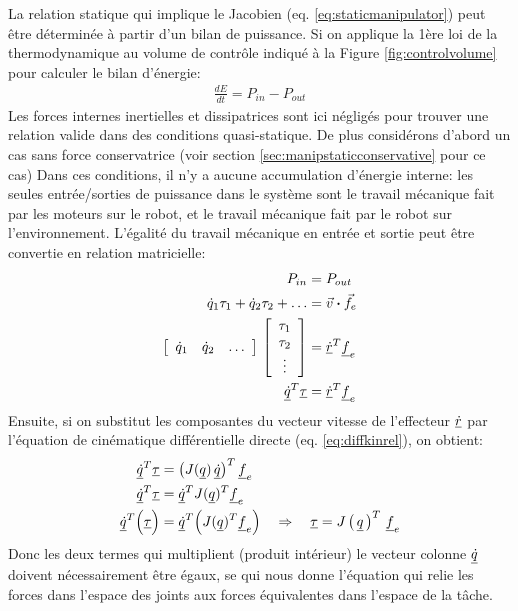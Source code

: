 La relation statique qui implique le Jacobien (eq. \eqref{eq:staticmanipulator}) peut être déterminée à partir d'un bilan de puissance. Si on applique la 1ère loi de la thermodynamique au volume de contrôle indiqué à la Figure \ref{fig:controlvolume} pour calculer le bilan d'énergie:
\begin{align}
\frac{dE}{dt} = P_{in} - P_{out}
\end{align}
Les forces internes inertielles et dissipatrices sont ici négligés pour trouver une relation valide dans des conditions quasi-statique. De plus considérons d'abord un cas sans force conservatrice (voir section \ref{sec:manipstaticconservative} pour ce cas) Dans ces conditions, il n'y a aucune accumulation d'énergie interne: les seules entrée/sorties de puissance dans le système sont le travail mécanique fait par les moteurs sur le robot, et le travail mécanique fait par le robot sur l'environnement. L'égalité du travail mécanique en entrée et sortie peut être convertie en relation matricielle:
\begin{align}
P_{in} &= P_{out} \\
\dot{q}_1 \tau_1  + \dot{q}_2 \tau_2 + \hdots  &= \Vec{v} \boldsymbol{\cdot} \Vec{f}_e \\
\left[ \begin{array}{c c c} 
\dot{q}_1 & \dot{q}_2 & \hdots 
\end{array} \right] \,
\left[ \begin{array}{c} 
\tau_1 \\ \tau_2 \\ \vdots 
\end{array} \right] &= \underline{\dot{r}}^T \underline{f}_e \\
\underline{\dot{q}}^T \underline{\tau} &= \underline{\dot{r}}^T \underline{f}_e \\
\end{align}
Ensuite, si on substitut les composantes du vecteur vitesse de l'effecteur $\underline{\dot{r}}$ par l'équation de cinématique différentielle directe (eq. \eqref{eq:diffkinrel}), on obtient:
\begin{align}
\underline{\dot{q}}^T \underline{\tau} &= \left( J( \underline{q}) \,  \underline{\dot{q}}  \right)^T \underline{f}_e \\
\underline{\dot{q}}^T \underline{\tau} &= \underline{\dot{q}}^T  J( \underline{q})^T \underline{f}_e    \\
\underline{\dot{q}}^T \Big( \underline{\tau} \Big) &= \underline{\dot{q}}^T  \Big( J( \underline{q})^T \underline{f}_e \Big)   
\quad \Rightarrow \quad \underline{\tau} = J\left( \, \underline{q} \, \right)^T \, \underline{f}_e 
\end{align}
Donc les deux termes qui multiplient (produit intérieur) le vecteur colonne $\underline{\dot{q}}$ doivent nécessairement être égaux, se qui nous donne l'équation qui relie les forces dans l'espace des joints aux forces équivalentes dans l'espace de la tâche. 


